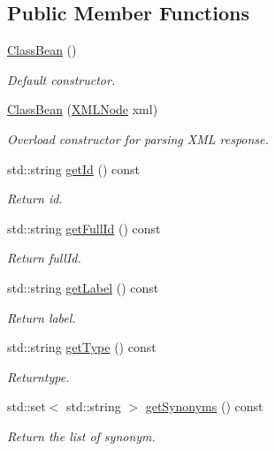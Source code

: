 \subsection*{Public Member Functions}
\begin{DoxyCompactItemize}
\item 
\hyperlink{classunisys_1_1ClassBean_a48b70a5fa37a3ea8c0fedbfe63ffb963}{Class\-Bean} ()
\begin{DoxyCompactList}\small\item\em Default constructor. \end{DoxyCompactList}\item 
\hyperlink{classunisys_1_1ClassBean_a390c1b87bd723fd746f8151867961997}{Class\-Bean} (\hyperlink{structXMLNode}{X\-M\-L\-Node} xml)
\begin{DoxyCompactList}\small\item\em Overload constructor for parsing X\-M\-L response. \end{DoxyCompactList}\item 
std\-::string \hyperlink{classunisys_1_1ClassBean_ae1d0891bd0143a853914f218a14a08ff}{get\-Id} () const 
\begin{DoxyCompactList}\small\item\em Return id. \end{DoxyCompactList}\item 
std\-::string \hyperlink{classunisys_1_1ClassBean_a53387132779d106a7dee6c897066480d}{get\-Full\-Id} () const 
\begin{DoxyCompactList}\small\item\em Return full\-Id. \end{DoxyCompactList}\item 
std\-::string \hyperlink{classunisys_1_1ClassBean_a0a503067b948f19b098d3d71ec4a120b}{get\-Label} () const 
\begin{DoxyCompactList}\small\item\em Return label. \end{DoxyCompactList}\item 
std\-::string \hyperlink{classunisys_1_1ClassBean_a83fecb8b41c64cc29d172b380ce16816}{get\-Type} () const 
\begin{DoxyCompactList}\small\item\em Returntype. \end{DoxyCompactList}\item 
std\-::set$<$ std\-::string $>$ \hyperlink{classunisys_1_1ClassBean_a7e7e54c7c889d696cfc7fdb22ba4b861}{get\-Synonyms} () const 
\begin{DoxyCompactList}\small\item\em Return the list of synonym. \end{DoxyCompactList}\item 

\end{DoxyCompactItemize}
